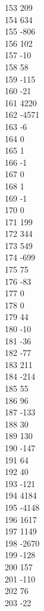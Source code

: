 { 153	209 \\
 154	634 \\
 155	-806 \\
 156	102 \\
 157	-10 \\
 158	58 \\
 159	-115 \\
 160	-21 \\
 161	4220 \\
 162	-4571 \\
 163	-6 \\
 164	0 \\
 165	1 \\
 166	-1 \\
 167	0 \\
 168	1 \\
 169	-1 \\
 170	0 \\
 171	199 \\
 172	344 \\
 173	549 \\
 174	-699 \\
 175	75 \\
 176	-83 \\
 177	0 \\
 178	0 \\
 179	44 \\
 180	-10 \\
 181	-36 \\
 182	-77 \\
 183	211 \\
 184	-214 \\
 185	55 \\
 186	96 \\
 187	-133 \\
 188	30 \\
 189	130 \\
 190	-147 \\
 191	64 \\
 192	40 \\
 193	-121 \\
 194	4184 \\
 195	-4148 \\
 196	1617 \\
 197	1149 \\
 198	-2670 \\
 199	-128 \\
 200	157 \\
 201	-110 \\
 202	76 \\
 203	-22 \\
}
